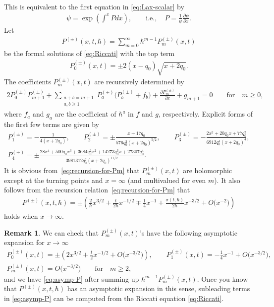 \documentclass[11pt]{article}
\theoremstyle{definition}
\newtheorem{rem}[thm]{Remark}
\numberwithin{equation}{section}
\def\p{\partial}
\begin{document}
This is equivalent to the f\/irst equation
in \eqref{eq:Lax-scalar} by
\begin{gather*}
\psi = \exp\left( \int^{x} Pdx \right), \qquad
 \text{i.e.}, \quad P = \frac{1}{\psi} \frac{\p \psi}{\p x}  .
\end{gather*}
Let
\begin{gather*}
P^{(\pm)}(x,t,\hbar) = \sum_{m=0}^{\infty}\hbar^{m-1}P^{(\pm)}_{m}(x,t)
\end{gather*}
be the formal solutions of \eqref{eq:Riccati} with the top term
\begin{gather*} %
P^{(\pm)}_{0}(x,t) = \pm 2(x-q_{0})\sqrt{x+2q_{0}}.
\end{gather*}
The coef\/f\/icients $P^{(\pm)}_{m}(x,t)$ are recursively determined by
\begin{gather} \label{eq:recursion-for-Pm}
2P^{(\pm)}_{0}P^{(\pm)}_{m+1} +
\sum_{\substack{a+b=m+1 \\ a,b \ge 1}}
P^{(\pm)}_{a} \big(P^{(\pm)}_{b} + f_{b}\big) +
\frac{\p P^{(\pm)}_{m}}{\p x} + g_{m+1} = 0 \qquad \text{for} \quad m \ge 0,
\end{gather}
where $f_{a}$ and $g_{a}$ are the coef\/f\/icient of $\hbar^{a}$
in $f$ and $g$, respectively. Explicit forms of the f\/irst few terms
are given by
\begin{gather*}
P^{(\pm)}_{1}   =   -\frac{1}{4(x+2q_{0})}, \qquad
P^{(\pm)}_{2}   =   \pm \frac{x+17q_{0}}{576q_{0}^{2}(x+2q_{0})^{5/2}}, \qquad
P^{(\pm)}_{3}   =   -\frac{2x^{2}+20q_{0}x+77q_{0}^{2}}
{6912q_{0}^{4}(x+2q_{0})^{4}}, \\
P^{(\pm)}_{4}   =   \pm \frac{28x^{4}+500q_{0}x^{3}+
3684q_{0}^{2}x^{2}+14273q_{0}^{3}x+27307q_{0}^{4}}
{3981312 q_{0}^{7}(x+2q_{0})^{11/2}}.
\end{gather*}
It is obvious from~\eqref{eq:recursion-for-Pm}
that $P^{(\pm)}_{m}(x,t)$ are holomorphic except
at the turning points and $x = \infty$
(and multivalued for even $m$).
It also follows from the recursion relation~\eqref{eq:recursion-for-Pm} that
\begin{gather} \label{eq:asymp-P}
P^{(\pm)}(x,t,\hbar)
= \pm \left(\frac{2}{\hbar}x^{3/2} + \frac{t}{2\hbar}x^{-1/2}
\mp \frac{1}{4}x^{-1} + \frac{\sigma(t,\hbar)}{2\hbar} x^{-3/2}
+ O\big(x^{-2}\big) \right)
\end{gather}
holds when $x \rightarrow \infty$.

\begin{rem} \label{rem:asymptotics}
We can check that $P^{(\pm)}_{m}(x,t)$'s
have the following asymptotic expansion for \mbox{$x \rightarrow \infty$}
\begin{gather*}
P^{(\pm)}_{0}(x,t)   =   \pm \left( 2x^{3/2} + \frac{t}{2}x^{-1/2}
+ O\big(x^{-3/2}\big) \right), \qquad
P^{(\pm)}_{1}(x,t)  =   -\frac{1}{4}x^{-1} + O\big(x^{-3/2}\big), \\
P^{(\pm)}_{m}(x,t)   =    O\big(x^{-3/2}\big) \qquad \text{for} \quad m \ge 2,
\end{gather*}
and we have \eqref{eq:asymp-P} after summing up
$\hbar^{m-1}P^{(\pm)}_{m}(x,t)$. Once you know that $P^{(\pm)}(x,t,\hbar)$
has an asymptotic expansion in this sense, subleading terms in
\eqref{eq:asymp-P} can be computed from
the Riccati equation \eqref{eq:Riccati}.
\end{rem}
\end{document}
